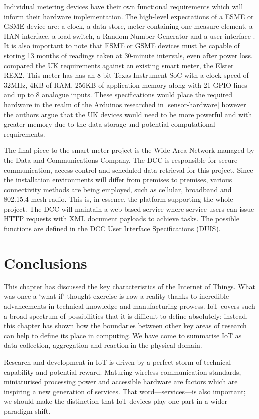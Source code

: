       Individual metering devices have their own functional requirements which will inform their hardware implementation. The high-level expectations of a ESME or GSME device are: a clock, a data store, meter containing one measure element, a HAN interface, a load switch, a Random Number Generator and a user interface \citep{smets:2014}. It is also important to note that ESME or GSME devices must be capable of storing 13 months of readings taken at 30-minute intervals, even after power loss. \citet{SMUK:2012} compared the UK requirements against an existing smart meter, the Elster REX2. This meter has has an 8-bit Texas Instrument SoC with a clock speed of 32MHz, 4KB of RAM, 256KB of application memory along with 21 GPIO lines and up to 8 analogue inputs. These specifications would place the required hardware in the realm of the Arduinos researched in \ref{sensor-hardware} however the authors argue that the UK devices would need to be more powerful and with greater memory due to the data storage and potential computational requirements.

      The final piece to the smart meter project is the Wide Area Network managed by the Data and Communications Company. The DCC is responsible for secure communication, access control and scheduled data retrieval for this project. Since the installation environments will differ from premises to premises, various connectivity methods are being employed, such as cellular, broadband and 802.15.4 mesh radio. This is, in essence, the platform supporting the whole project. The DCC will maintain a web-based service where service users can issue HTTP requests with XML document payloads to achieve tasks. The possible functions are defined in the DCC User Interface Specifications (DUIS).

  \section{Conclusions}
    This chapter has discussed the key characteristics of the Internet of Things. What was once a `what if' thought exercise is now a reality thanks to incredible advancements in technical knowledge and manufacturing prowess. IoT covers such a broad spectrum of possibilities that it is difficult to define absolutely; instead, this chapter has shown how the boundaries between other key areas of research can help to define its place in computing. We have come to summarise IoT as data collection, aggregation and reaction in the physical domain.

    Research and development in IoT is driven by a perfect storm of technical capability and potential reward. Maturing wireless communication standards, miniaturised processing power and accessible hardware are factors which are inspiring a new generation of services. That word---services---is also important; we should make the distinction that IoT devices play one part in a wider paradigm shift.

